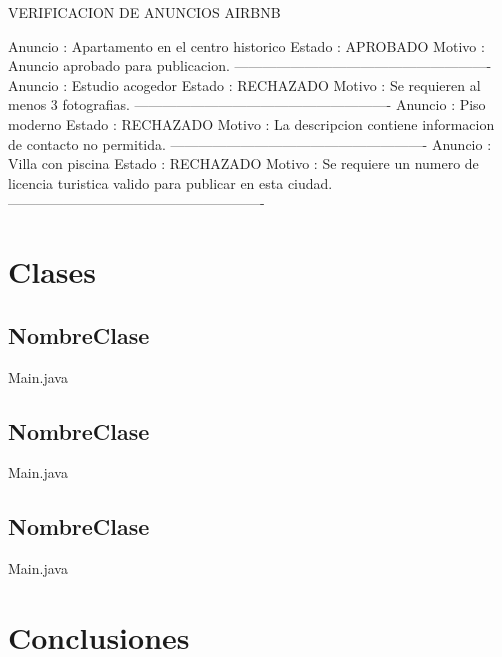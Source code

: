 \begin{salida}
VERIFICACION DE ANUNCIOS AIRBNB

Anuncio : Apartamento en el centro historico
Estado  : APROBADO
Motivo  : Anuncio aprobado para publicacion.
-------------------------------------------------------
Anuncio : Estudio acogedor
Estado  : RECHAZADO
Motivo  : Se requieren al menos 3 fotografias.
-------------------------------------------------------
Anuncio : Piso moderno
Estado  : RECHAZADO
Motivo  : La descripcion contiene informacion de contacto no permitida.
-------------------------------------------------------
Anuncio : Villa con piscina
Estado  : RECHAZADO
Motivo  : Se requiere un numero de licencia turistica valido para publicar en esta ciudad.
-------------------------------------------------------
\end{salida}


\section{Clases}

\subsection{NombreClase}

\begin{codigof}{Main.java}
 
\end{codigof}


\subsection{NombreClase}

\begin{codigof}{Main.java}
 
\end{codigof}


\subsection{NombreClase}

\begin{codigof}{Main.java}
 
\end{codigof}


\section{Conclusiones}

